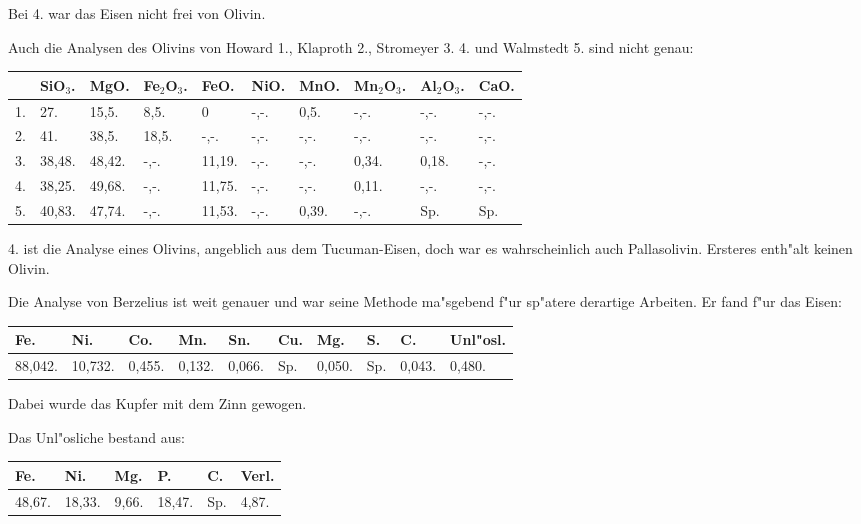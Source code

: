 \documentclass[a4paper, 11pt, oneside]{article}
\begin{document}
Bei 4. war das Eisen nicht frei von Olivin.

Auch die Analysen des Olivins von Howard 1., Klaproth 2., Stromeyer 3. 4. und Walmstedt 5. sind nicht genau:
\begin{table}[H]
    \centering\swabfamily\Large
    \normalsize
    \begin{tabular}{l l l l l l l l l l}
         & SiO$_{3}$. & MgO. & Fe$_{2}$O$_{3}$. & FeO. & NiO. & MnO. & Mn$_{2}$O$_{3}$. & Al$_{2}$O$_{3}$. & CaO. \\ \hline
        1. & 27. & 15,5. & 8,5. & 0 & -,-. & 0,5. & -,-. & -,-. & -,-. \\
        2. & 41. & 38,5. & 18,5. & -,-. & -,-. & -,-. & -,-. & -,-. & -,-. \\
        3. & 38,48. & 48,42. & -,-. & 11,19. & -,-. & -,-. & 0,34. & 0,18. & -,-. \\
        4. & 38,25. & 49,68. & -,-. & 11,75. & -,-. & -,-. & 0,11. & -,-. & -,-. \\
        5. & 40,83. & 47,74. & -,-. & 11,53. & -,-. & 0,39. & -,-. & Sp. & Sp. \\
    \end{tabular}
\end{table}

4. ist die Analyse eines Olivins, angeblich aus dem Tucuman-Eisen, doch war es wahrscheinlich auch Pallasolivin. Ersteres enth"alt keinen Olivin.

Die Analyse von Berzelius ist weit genauer und war seine Methode ma"sgebend f"ur sp"atere derartige Arbeiten. Er fand f"ur das Eisen:
\begin{table}[H]
    \centering\swabfamily\Large
    \normalsize
    \begin{tabular}{l l l l l l l l l l}
        Fe. & Ni. & Co. & Mn. & Sn. & Cu. & Mg. & S. & C. & Unl"osl. \\ \hline
        88,042. & 10,732. & 0,455. & 0,132. & 0,066. & Sp. & 0,050. & Sp. & 0,043. & 0,480. \\
    \end{tabular}
\end{table}

Dabei wurde das Kupfer mit dem Zinn gewogen.

Das Unl"osliche bestand aus:
\begin{table}[H]
    \centering\swabfamily\Large
    \begin{tabular}{l l l l l l}
        Fe. & Ni. & Mg. & P. & C. & Verl. \\ \hline
        48,67. & 18,33. & 9,66. & 18,47. & Sp. & 4,87. \\
    \end{tabular}
\end{table}
\end{document}
